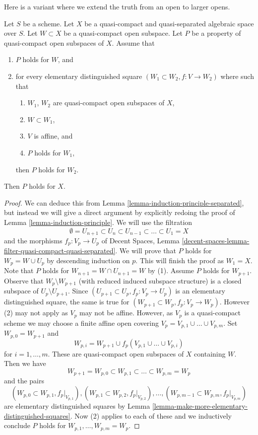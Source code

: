 \noindent
Here is a variant where we extend the truth from an open to larger opens.

\begin{lemma}
\label{lemma-induction-principle-enlarge}
Let $S$ be a scheme. Let $X$ be a quasi-compact and quasi-separated
algebraic space over $S$. Let $W \subset X$ be a quasi-compact open
subspace. Let $P$ be a property of quasi-compact open subspaces of $X$.
Assume that
\begin{enumerate}
\item $P$ holds for $W$, and
\item for every elementary distinguished square
$(W_1 \subset W_2, f : V \to W_2)$ where 
such that
\begin{enumerate}
\item $W_1$, $W_2$ are quasi-compact open subspaces of $X$,
\item $W \subset W_1$,
\item $V$ is affine, and
\item $P$ holds for $W_1$,
\end{enumerate}
then $P$ holds for $W_2$.
\end{enumerate}
Then $P$ holds for $X$.
\end{lemma}

\begin{proof}
We can deduce this from Lemma \ref{lemma-induction-principle-separated},
but instead we will give a direct argument by explicitly redoing the proof of
Lemma \ref{lemma-induction-principle}. We will use the filtration
$$
\emptyset = U_{n + 1} \subset
U_n \subset U_{n - 1} \subset \ldots \subset U_1 = X
$$
and the morphisms $f_p : V_p \to U_p$ of
Decent Spaces, Lemma
\ref{decent-spaces-lemma-filter-quasi-compact-quasi-separated}.
We will prove that $P$ holds for $W_p = W \cup U_p$ by descending
induction on $p$. This will finish the proof as $W_1 = X$.
Note that $P$ holds for $W_{n + 1} = W \cap U_{n + 1} = W$
by (1). Assume $P$ holds for $W_{p + 1}$. Observe that
$W_p \setminus W_{p + 1}$ (with reduced induced subspace structure)
is a closed subspace of $U_p \setminus U_{p + 1}$.
Since $(U_{p + 1} \subset U_p, f_p : V_p \to U_p)$ is an elementary
distinguished square, the same is true for
$(W_{p + 1} \subset W_p, f_p : V_p \to W_p)$.
However (2) may not apply as $V_p$ may not be affine.
However, as $V_p$ is a quasi-compact scheme we may choose
a finite affine open covering $V_p = V_{p, 1} \cup \ldots \cup V_{p, m}$.
Set $W_{p, 0} = W_{p + 1}$ and
$$
W_{p, i} = W_{p + 1} \cup f_p(V_{p, 1} \cup \ldots \cup V_{p, i})
$$
for $i = 1, \ldots, m$. These are quasi-compact open subspaces of $X$
containing $W$. Then we have
$$
W_{p + 1} = W_{p, 0} \subset
W_{p, 1} \subset \ldots \subset
W_{p, m} = W_p
$$
and the pairs
$$
(W_{p, 0} \subset W_{p, 1}, f_p|_{V_{p, 1}}),
(W_{p, 1} \subset W_{p, 2}, f_p|_{V_{p, 2}}),\ldots,
(W_{p, m - 1} \subset W_{p, m}, f_p|_{V_{p, m}})
$$
are elementary distinguished squares by
Lemma \ref{lemma-make-more-elementary-distinguished-squares}.
Now (2) applies to each of these and we inductively
conclude $P$ holds for $W_{p, 1}, \ldots, W_{p, m} = W_p$.
\end{proof}



